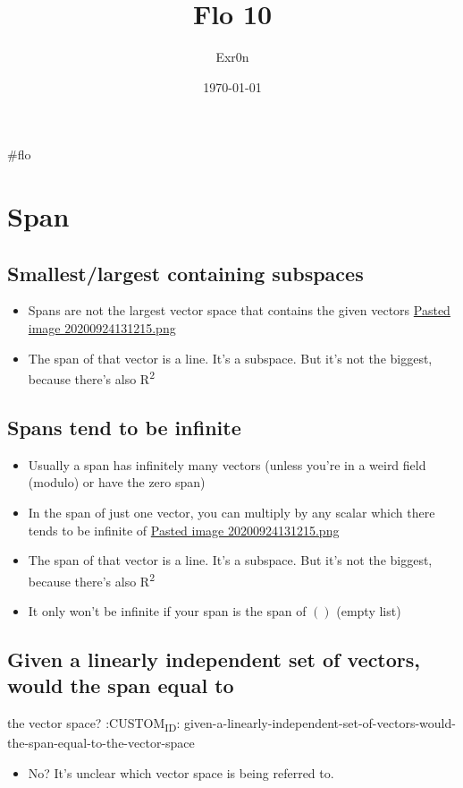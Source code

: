 \documentclass[letterpaper]{article}
\author{Exr0n}
\date{\today}
\title{Flo 10}
\renewcommand{\tableofcontents}{}
\begin{document}
\tableofcontents

\#flo

\section{Span}
\label{sec:org1add041}
\subsection{Smallest/largest containing subspaces}
\label{sec:org63f2d36}
\begin{itemize}
\item Spans are not the largest vector space that contains the given vectors
\href{Pasted image 20200924131215.png.org}{Pasted image
20200924131215.png}
\item The span of that vector is a line. It's a subspace. But it's not the
biggest, because there's also R\textsuperscript{2}
\end{itemize}

\subsection{Spans tend to be infinite}
\label{sec:org86330b5}
\begin{itemize}
\item Usually a span has infinitely many vectors (unless you're in a weird
field (modulo) or have the zero span)
\item In the span of just one vector, you can multiply by any scalar which
there tends to be infinite of \href{Pasted image 20200924131215.png.org}{Pasted image 20200924131215.png}
\item The span of that vector is a line. It's a subspace. But it's not the
biggest, because there's also R\textsuperscript{2}
\item It only won't be infinite if your span is the span of \(()\) (empty
list)
\end{itemize}

\subsection{Given a linearly independent set of vectors, would the span equal to}
\label{sec:org14fa858}
the vector space?
:CUSTOM\textsubscript{ID}: given-a-linearly-independent-set-of-vectors-would-the-span-equal-to-the-vector-space

\begin{itemize}
\item No? It's unclear which vector space is being referred to.
\end{itemize}
\end{document}

